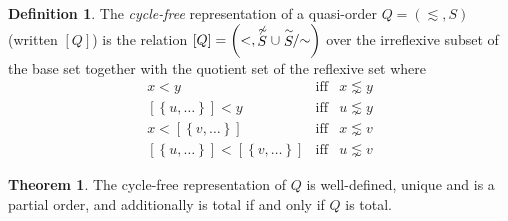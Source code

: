 \documentclass[12pt]{article}
\theoremstyle{definition}
\newtheorem{definition}{Definition}[section]
\theoremstyle{theorem}
\newtheorem{theorem}{Theorem}[section]
\def\aset#1{\left\{{#1}\right\}}
\begin{document}
\begin{definition}
  The \emph{cycle-free} representation of a quasi-order
  $Q=(\lesssim,S)$ (written $[Q]$) is the relation \( [Q] = \left(<,
  \stackrel{\not\sim}{S} \cup \stackrel{\sim}{S}\!\!/{\mathord\sim}\right) \) over the irreflexive
  subset of the base set together with the quotient set of the
  reflexive set where
  \begin{eqnarray*}
    x < y &\textrm{iff}& x \lnsim y \\
    {[\aset{u,\ldots}]} < y &\textrm{iff}& u \lnsim y \\
    x < [\aset{v,\ldots}] & \textrm{iff}& x \lnsim v \\
    {[\aset{u,\ldots}]} < [\aset{v,\ldots}] & \textrm{iff} & u \lnsim
    v
  \end{eqnarray*}
\end{definition}
\begin{theorem}
  The cycle-free representation of $Q$ is well-defined, unique and is a
  partial order, and additionally is total if and only if $Q$ is total.
\end{theorem}
\end{document}
